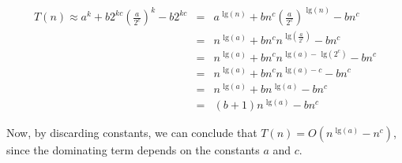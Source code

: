 \documentclass[11pt]{article}
\newcommand{\tlg}{\text{ lg}}
\begin{document}
\begin{sol}
\begin{eqnarray*}
T(n) \approx a^{k} + b2^{kc}(\frac{a}{2^c})^k - b2^{kc} & = & a^{\tlg(n)} + bn^c(\frac{a}{2^c})^{\tlg(n)} - bn^c \\
& = & n^{\tlg(a)} + bn^cn^{\tlg(\frac{a}{2^c})} - bn^c \\ 
& = & n^{\tlg(a)} + bn^cn^{\tlg(a) - \tlg(2^c)} - bn^c \\
& = & n^{\tlg(a)} + bn^cn^{\tlg(a) - c} - bn^c \\
& = & n^{\tlg(a)} + bn^{\tlg(a)} - bn^c \\
& = & (b+1)n^{\tlg(a)} - bn^c
\end{eqnarray*}

Now, by discarding constants, we can conclude that $T(n) = O(n^{\tlg(a)} - n^c)$, since the dominating term depends on the constants $a$ and $c$.

\begin{comment}
Now we make the observation that $a^j(\frac{n}{2^j})^{c} = a^jn^c(\frac{1}{2^c})^j = a^jn^c(\frac{1}{2^j})^c = n^c(\frac{a}{2^c})^j$, so we can re-write the summation above as $n^{c}\sum_{j=0}^{k-1} (\frac{a}{2^c})^{j}$. We now have the following:

\begin{eqnarray*}
T(n) & =&  a^{k} + n^{c}b\sum_{j=0}^{k-1} (\frac{a}{2^c})^j \\
& = & a^{k} + n^{c}b\Bigg(\frac{(\frac{a}{2^c})^k - 1}{(\frac{a}{2^c}) - 1}\Bigg) \\
& = & a^{k} + \frac{bn^c(\frac{a}{2^c})^k}{(\frac{a}{2^c}) - 1} - \frac{bn^c}{(\frac{a}{2^c}) - 1}
\end{eqnarray*}

Now, we can observe that $a^{k} + \frac{bn^c(\frac{a}{2^c})^k}{(\frac{a}{2^c}) - 1} - \frac{bn^c}{(\frac{a}{2^c}) - 1} < a^{k} + bn^c(\frac{a}{2^c})^k$. Now, by replacing $k$ with $\tlg(n)$, we have the following:

\begin{eqnarray*}
T(n) <  a^{\tlg(n)} + bn^c(\frac{a}{2^c})^{\tlg(n)} & = & n^{\tlg(a)} + bn^cn^{\tlg(\frac{a}{2^c})} \\
& = & n^{\tlg(a)} + bn^cn^{\tlg(a) - \tlg(2^c)} \\
& = & n^{\tlg(a)} + bn^cn^{\tlg(a) - c} \\
& = & n^{\tlg(a)} + bn^{\tlg(a) - c + c} \\
& = & (b+1)n^{\tlg(a)}
\end{eqnarray*}

Therefore, we can conclude that $T(n) = O(n^{\tlg(a)})$.
\end{comment}

\end{sol}
\end{document}

